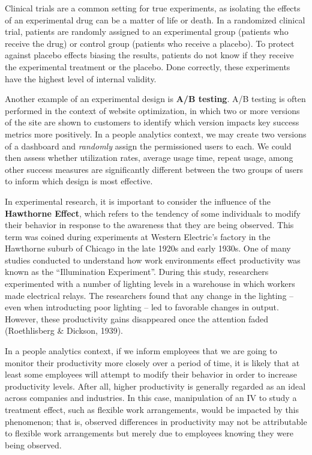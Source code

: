 \documentclass[]{book}
\begin{document}
Clinical trials are a common setting for true experiments, as isolating the effects of an experimental drug can be a matter of life or death. In a randomized clinical trial, patients are randomly assigned to an experimental group (patients who receive the drug) or control group (patients who receive a placebo). To protect against placebo effects biasing the results, patients do not know if they receive the experimental treatment or the placebo. Done correctly, these experiments have the highest level of internal validity.

Another example of an experimental design is \textbf{A/B testing}. A/B testing is often performed in the context of website optimization, in which two or more versions of the site are shown to customers to identify which version impacts key success metrics more positively. In a people analytics context, we may create two versions of a dashboard and \emph{randomly} assign the permissioned users to each. We could then assess whether utilization rates, average usage time, repeat usage, among other success measures are significantly different between the two groups of users to inform which design is most effective.

In experimental research, it is important to consider the influence of the \textbf{Hawthorne Effect}, which refers to the tendency of some individuals to modify their behavior in response to the awareness that they are being observed. This term was coined during experiments at Western Electric's factory in the Hawthorne suburb of Chicago in the late 1920s and early 1930s. One of many studies conducted to understand how work environments effect productivity was known as the ``Illumination Experiment''. During this study, researchers experimented with a number of lighting levels in a warehouse in which workers made electrical relays. The researchers found that any change in the lighting -- even when introducting poor lighting -- led to favorable changes in output. However, these productivity gains disappeared once the attention faded (Roethlisberg \& Dickson, 1939).

In a people analytics context, if we inform employees that we are going to monitor their productivity more closely over a period of time, it is likely that at least some employees will attempt to modify their behavior in order to increase productivity levels. After all, higher productivity is generally regarded as an ideal across companies and industries. In this case, manipulation of an IV to study a treatment effect, such as flexible work arrangements, would be impacted by this phenomenon; that is, observed differences in productivity may not be attributable to flexible work arrangements but merely due to employees knowing they were being observed.
\end{document}
